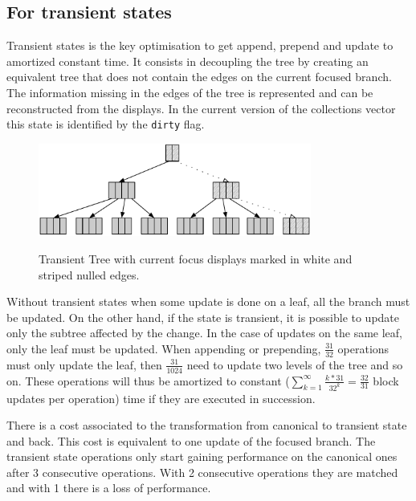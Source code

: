 
\subsection{For transient states}
\label{sec:DisplaysTransient}
Transient states is the key optimisation to get append, prepend and update to amortized constant time. It consists in decoupling the tree by creating an equivalent tree that does not contain the edges on the current focused branch. The information missing in the edges of the tree is represented and can be reconstructed from the displays. In the current version of the collections vector \cite{scalaVector211} this state is identified by the \texttt{dirty} flag.

\begin{figure}[h!]
  \centering
  \includegraphics[width=0.8\textwidth]{Figures/Transient_state}
  \label{Transient_state}
  \caption{Transient Tree with current focus displays marked in white and striped nulled edges.}
\end{figure}

Without transient states when some update is done on a leaf, all the branch must be updated. On the other hand, if the state is transient, it is possible to update only the subtree affected by the change. In the case of updates on the same leaf, only the leaf must be updated. When appending or prepending, $\frac{31}{32}$ operations must only update the leaf, then $\frac{31}{1024}$ need to update two levels of the tree and so on. These operations will thus be amortized to constant ($\sum_{k=1}^{\infty} \frac{k*31}{32^k} = \frac{32}{31}$ block updates per operation) time if they are executed in succession.

There is a cost associated to the transformation from canonical to transient state and back. This cost is equivalent to one update of the focused branch. The transient state operations only start gaining performance on the canonical ones after 3 consecutive operations. With 2 consecutive operations they are matched and with 1 there is a loss of performance.

